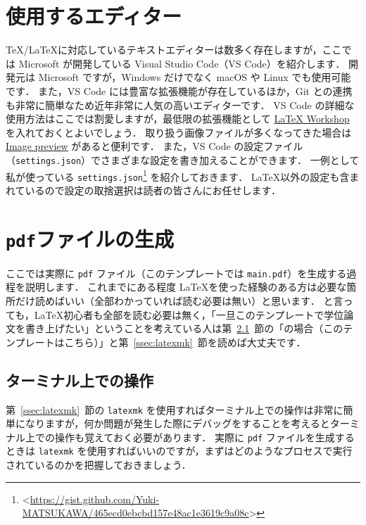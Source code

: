 \section{使用するエディター}
\label{sec:editor}

\TeX/\LaTeX に対応しているテキストエディターは数多く存在しますが，ここでは Microsoft が開発している Visual Studio Code（VS Code）を紹介します．
開発元は Microsoft ですが，Windows だけでなく macOS や Linux でも使用可能です．
また，VS Code には豊富な拡張機能が存在しているほか，Git との連携も非常に簡単なため近年非常に人気の高いエディターです．
VS Code の詳細な使用方法はここでは割愛しますが，最低限の拡張機能として \href{https://marketplace.visualstudio.com/items?itemName=James-Yu.latex-workshop}{LaTeX Workshop} を入れておくとよいでしょう．
取り扱う画像ファイルが多くなってきた場合は \href{https://marketplace.visualstudio.com/items?itemName=kisstkondoros.vscode-gutter-preview}{Image preview} があると便利です．
また，VS Code の設定ファイル（\verb|settings.json|）でさまざまな設定を書き加えることができます．
一例として私が使っている \verb|settings.json|\footnote{\textless\url{https://gist.github.com/Yuki-MATSUKAWA/465ecd0ebcbd157e48ac1e3619c9a08c}\textgreater} を紹介しておきます．
\LaTeX 以外の設定も含まれているので設定の取捨選択は読者の皆さんにお任せします．

\section{\texttt{pdf}ファイルの生成}
\label{sec:makepdf}

ここでは実際に \verb|pdf| ファイル（このテンプレートでは \verb|main.pdf|）を生成する過程を説明します．
これまでにある程度 \LaTeX を使った経験のある方は必要な箇所だけ読めばいい（全部わかっていれば読む必要は無い）と思います．
と言っても，\LaTeX 初心者も全部を読む必要は無く，「一旦このテンプレートで学位論文を書き上げたい」ということを考えている人は第~\ref{ssec:terminal}~節の「\LuaLaTeX の場合（このテンプレートはこちら）」と第~\ref{ssec:latexmk}~節を読めば大丈夫です．

\subsection{ターミナル上での操作}
\label{ssec:terminal}

第~\ref{ssec:latexmk}~節の \verb|latexmk| を使用すればターミナル上での操作は非常に簡単になりますが，何か問題が発生した際にデバッグをすることを考えるとターミナル上での操作も覚えておく必要があります．
実際に \verb|pdf| ファイルを生成するときは \verb|latexmk| を使用すればいいのですが，まずはどのようなプロセスで実行されているのかを把握しておきましょう．

